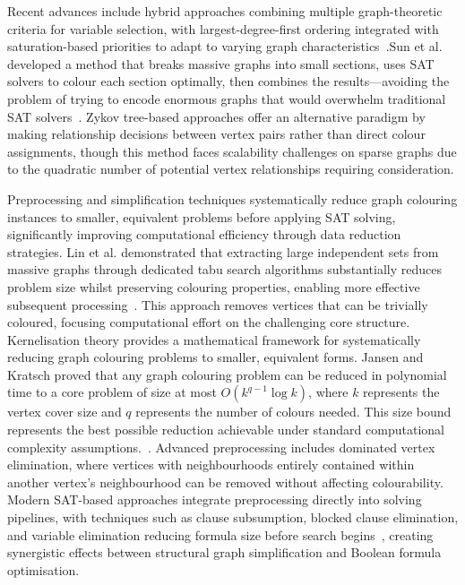 Recent advances include hybrid approaches combining multiple graph-theoretic criteria for variable selection, with largest-degree-first ordering integrated with saturation-based priorities to adapt to varying graph characteristics~\cite{catalyurek2012ordering}.Sun et al. developed a method that breaks massive graphs into small sections, uses SAT solvers to colour each section optimally, then combines the results—avoiding the problem of trying to encode enormous graphs that would overwhelm traditional SAT solvers~\cite{sun2023sat}. Zykov tree-based approaches offer an alternative paradigm by making relationship decisions between vertex pairs rather than direct colour assignments, though this method faces scalability challenges on sparse graphs due to the quadratic number of potential vertex relationships requiring consideration.

Preprocessing and simplification techniques systematically reduce graph colouring instances to smaller, equivalent problems before applying SAT solving, significantly improving computational efficiency through data reduction strategies. Lin et al. demonstrated that extracting large independent sets from massive graphs through dedicated tabu search algorithms substantially reduces problem size whilst preserving colouring properties, enabling more effective subsequent processing~\cite{lin2012coloring}. This approach removes vertices that can be trivially coloured, focusing computational effort on the challenging core structure.
Kernelisation theory provides a mathematical framework for systematically reducing graph colouring problems to smaller, equivalent forms. Jansen and Kratsch proved that any graph colouring problem can be reduced in polynomial time to a core problem of size at most $O(k^{q-1}\log k)$, where $k$ represents the vertex cover size and $q$ represents the number of colours needed. This size bound represents the best possible reduction achievable under standard computational complexity assumptions.~\cite{jansen2013data}. Advanced preprocessing includes dominated vertex elimination, where vertices with neighbourhoods entirely contained within another vertex's neighbourhood can be removed without affecting colourability. Modern SAT-based approaches integrate preprocessing directly into solving pipelines, with techniques such as clause subsumption, blocked clause elimination, and variable elimination reducing formula size before search begins~\cite{cao2021hash}, creating synergistic effects between structural graph simplification and Boolean formula optimisation.

